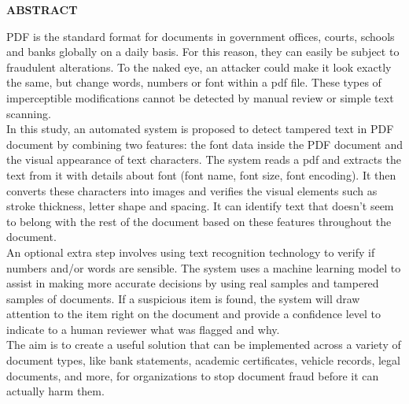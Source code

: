 \begin{center}
    \textbf{\LARGE ABSTRACT}\\[40pt]
\end{center}
PDF is the standard format for documents in government offices, courts, schools and banks globally on a daily basis. For this reason, they can easily be subject to fraudulent alterations. To the naked eye, an attacker could make it look exactly the same, but change words, numbers or font within a pdf file. These types of imperceptible modifications cannot be detected by manual review or simple text scanning.\\

\noindent In this study, an automated system is proposed to detect tampered text in PDF document by combining two features: the font data inside the PDF document and the visual appearance of text characters. The system reads a pdf and extracts the text from it with details about font (font name, font size, font encoding). It then converts these characters into images and \mbox{verifies} the visual elements such as stroke thickness, letter shape and spacing. It can identify text that doesn't seem to belong with the rest of the document based on these features throughout the document.\\

\noindent An optional extra step involves using text recognition technology to verify if numbers and/or words are sensible. The system uses a machine learning model to assist in making more \mbox{accurate} decisions by using real samples and tampered samples of documents. If a suspicious item is found, the system will draw attention to the item right on the document and provide a confidence level to indicate to a human reviewer what was flagged and why.\\

\noindent The aim is to create a useful solution that can be implemented across a variety of document types, like bank statements, academic certificates, vehicle records, legal documents, and more, for organizations to stop document fraud before it can actually harm them.
